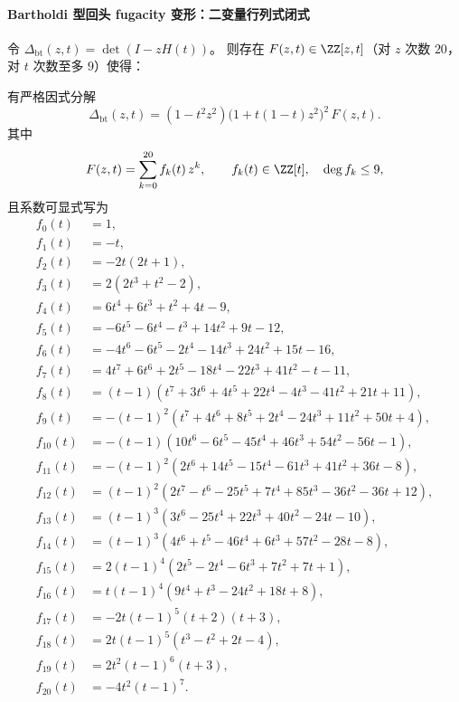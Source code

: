 \paragraph{Bartholdi 型回头 fugacity 变形：二变量行列式闭式}
令 \(\Delta_{\mathrm{bt}}(z,t)=\det(I-zH(t))\)。
则存在 \(F(z,t)\in\ZZ[z,t]\)（对 \(z\) 次数 \(20\)，对 \(t\) 次数至多 \(9\)）使得：
\begin{theorem}\label{thm:real-input-40-bartholdi-det}
有严格因式分解
\[
\boxed{
\Delta_{\mathrm{bt}}(z,t)=(1-t^2 z^2)\bigl(1+t(1-t)z^2\bigr)^2\,F(z,t).
}
\]
其中
\[
F(z,t)=\sum_{k=0}^{20}f_k(t)\,z^k,\qquad f_k(t)\in\ZZ[t],\quad \deg f_k\le 9,
\]
且系数可显式写为
\[
\begin{aligned}
f_0(t)&=1,\\
f_1(t)&=-t,\\
f_2(t)&=-2t(2t+1),\\
f_3(t)&=2(2t^3+t^2-2),\\
f_4(t)&=6t^4+6t^3+t^2+4t-9,\\
f_5(t)&=-6t^5-6t^4-t^3+14t^2+9t-12,\\
f_6(t)&=-4t^6-6t^5-2t^4-14t^3+24t^2+15t-16,\\
f_7(t)&=4t^7+6t^6+2t^5-18t^4-22t^3+41t^2-t-11,\\
f_8(t)&=(t-1)(t^7+3t^6+4t^5+22t^4-4t^3-41t^2+21t+11),\\
f_9(t)&=-(t-1)^2(t^7+4t^6+8t^5+2t^4-24t^3+11t^2+50t+4),\\
f_{10}(t)&=-(t-1)(10t^6-6t^5-45t^4+46t^3+54t^2-56t-1),\\
f_{11}(t)&=-(t-1)^2(2t^6+14t^5-15t^4-61t^3+41t^2+36t-8),\\
f_{12}(t)&=(t-1)^2(2t^7-t^6-25t^5+7t^4+85t^3-36t^2-36t+12),\\
f_{13}(t)&=(t-1)^3(3t^6-25t^4+22t^3+40t^2-24t-10),\\
f_{14}(t)&=(t-1)^3(4t^6+t^5-46t^4+6t^3+57t^2-28t-8),\\
f_{15}(t)&=2(t-1)^4(2t^5-2t^4-6t^3+7t^2+7t+1),\\
f_{16}(t)&=t(t-1)^4(9t^4+t^3-24t^2+18t+8),\\
f_{17}(t)&=-2t(t-1)^5(t+2)(t+3),\\
f_{18}(t)&=2t(t-1)^5(t^3-t^2+2t-4),\\
f_{19}(t)&=2t^2(t-1)^6(t+3),\\
f_{20}(t)&=-4t^2(t-1)^7.
\end{aligned}
\]
\end{theorem}

